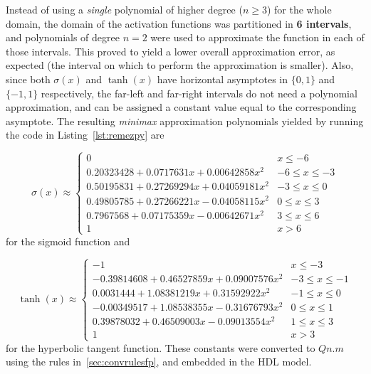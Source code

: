 Instead of using a \emph{single} polynomial of higher degree ($n \geq 3$) for the whole domain, the domain of the activation functions was partitioned
in \textbf{6 intervals}, and polynomials of degree $n=2$ were used to approximate the function in each of those intervals. This proved to yield a lower overall approximation error,
as expected (the interval on which to perform the approximation is smaller). Also, since both $\sigma(x)$ and $\tanh(x)$ have horizontal asymptotes
in $\{0,1\}$ and $\{-1,1\}$ respectively, the far-left and far-right intervals do not need a polynomial approximation, and can be assigned a constant value
equal to the corresponding asymptote. The resulting \textit{minimax} approximation polynomials yielded by running the code in Listing~\ref{lst:remezpy} are

\begin{equation}\label{eq:coefs_sigm}
\sigma(x) \approx \left\{
\begin{array}{lc}
0 & x  \leq -6 \\
0.20323428 + 0.0717631x + 0.00642858x^2 & -6 \leq x \leq -3 \\
0.50195831 + 0.27269294x + 0.04059181x^2 & -3 \leq  x \leq 0 \\
0.49805785 + 0.27266221x - 0.04058115x^2 &  0 \leq  x \leq 3 \\
0.7967568 + 0.07175359x - 0.00642671x^2 & 3 \leq  x \leq 6 \\
1 & x > 6
\end{array}
\right.
\end{equation}
for the sigmoid function and

\begin{equation}\label{eq:coefs_tanh}
\tanh(x) \approx \left\{
\begin{array}{lc}
-1 & x  \leq -3 \\
-0.39814608 + 0.46527859x + 0.09007576x^2 & -3 \leq x \leq -1 \\
0.0031444 + 1.08381219x + 0.31592922x^2 & -1 \leq  x \leq 0 \\
-0.00349517 + 1.08538355x -0.31676793x^2 &  0 \leq  x \leq 1 \\
0.39878032 + 0.46509003x - 0.09013554x^2 & 1 \leq  x \leq 3 \\
1 & x > 3
\end{array}
\right.
\end{equation}
for the hyperbolic tangent function. These constants were converted to $Qn.m$ using the rules in~\ref{sec:convrulesfp}, and embedded in the HDL model.

